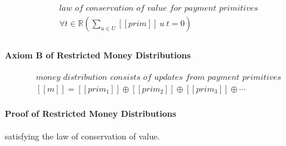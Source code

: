\begin{equation}
    \begin{split}
        &\textit{law of conservation of value for payment primitives} \\
        &\forall t \in \mathbb{R} ({\displaystyle \sum_{u \in U} [\![prim]\!]\ u\ t = 0}) \\
    \end{split}
\end{equation}

\paragraph{Axiom B of Restricted Money Distributions}

\begin{equation}
    \begin{split}
        &\textit{money distribution consists of updates from payment primitives} \\
        &[\![m]\!] = [\![prim_1]\!] \oplus [\![prim_2]\!] \oplus [\![prim_3]\!] \oplus \dotsb
    \end{split}
\end{equation}

\paragraph{Proof of Restricted Money Distributions}

satisfying the law of conservation of value.

